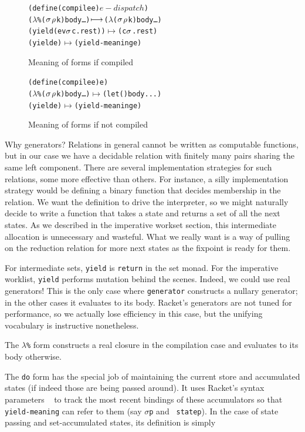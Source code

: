 \documentclass[preprint,onecolumn,9pt]{sigplanconf} %
\begin{document}
\begin{figure}
\begin{alltt}
(define (compile e) \(e-dispatch\))
(\(\lambda\)\% (\(\msto\) \(\menv\) k) body \ldots) \(\machstep\) (\(\lambda\) (\(\msto\) \(\menv\) k) body \ldots)
(yield (ev \(\msto\) c . rest)) \(\longmapsto\) (c \(\msto\) . rest)
(yield e) \(\longmapsto\) (yield-meaning e)
\end{alltt}
\caption{Meaning of forms if compiled}
\label{fig:cfm}
\end{figure}

\begin{figure}
\begin{alltt}
(define (compile e) e)
(\(\lambda\)\% (\(\msto\) \(\menv\) k) body \ldots) \(\longmapsto\) (let () body ...)
(yield e) \(\longmapsto\) (yield-meaning e)
\end{alltt}
\caption{Meaning of forms if not compiled}
\label{fig:ncfm}
\end{figure}

Why generators? Relations in general cannot be written as computable
functions, but in our case we have a decidable relation with finitely
many pairs sharing the same left component. There are several
implementation strategies for such relations, some more effective than
others. For instance, a silly implementation strategy would be
defining a binary function that decides membership in the relation. We
want the definition to drive the interpreter, so we might naturally
decide to write a function that takes a state and returns a set of all
the next states. As we described in the imperative workset section,
this intermediate allocation is unnecessary and wasteful. What we
really want is a way of pulling on the reduction relation for more
next states as the fixpoint is ready for them.

For intermediate sets, {\tt yield} is {\tt return} in the set
monad. For the imperative worklist, {\tt yield} performs mutation
behind the scenes. Indeed, we could use real generators! This is the
only case where {\tt generator} constructs a nullary generator; in the
other cases it evaluates to its body. Racket's generators are not
tuned for performance, so we actually lose efficiency in this case,
but the unifying vocabulary is instructive nonetheless.

The {\tt $\lambda$\%} form constructs a real closure in the
compilation case and evaluates to its body otherwise.

The {\tt do} form has the special job of maintaining the current store
and accumulated states (if indeed those are being passed around). It
uses Racket's syntax parameters ~\cite{dvanhorn:eli/stxparam} to
track the most recent bindings of these accumulators so that {\tt
  yield-meaning} can refer to them (say {\tt $\sigma$p} and {\tt
  statep}). In the case of state passing and set-accumulated states, its
definition is simply
\end{document}
